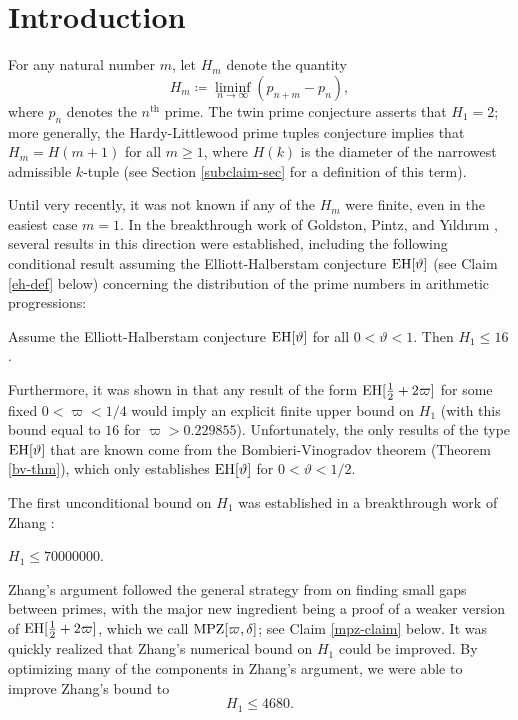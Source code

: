
\section{Introduction}

For any natural number $m$, let $H_m$ denote the quantity
$$ H_m \coloneqq \liminf_{n \to \infty} (p_{n+m} - p_n),$$
where $p_n$ denotes the $n^{\operatorname{th}}$ prime.  The twin prime conjecture asserts that $H_1=2$; more generally, the Hardy-Littlewood prime tuples conjecture \cite{hardy} implies that $H_m = H(m+1)$ for all $m \geq 1$, where $H(k)$ is the diameter of the narrowest admissible $k$-tuple (see Section \ref{subclaim-sec} for a definition of this term).  

Until very recently, it was not known if any of the $H_m$ were finite, even in the easiest case $m=1$.  In the breakthrough work of Goldston, Pintz, and Y{\i}ld{\i}r{\i}m \cite{gpy}, several results in this direction were established, including the following conditional result assuming the Elliott-Halberstam conjecture $\operatorname*{EH}[\vartheta]$ (see Claim \ref{eh-def} below) concerning the distribution of the prime numbers in arithmetic progressions:

\begin{theorem}\label{gpy-thm}  Assume the Elliott-Halberstam conjecture $\operatorname*{EH}[\vartheta]$ for all $0 < \vartheta < 1$.  Then $H_1 \leq 16$.
\end{theorem}

Furthermore, it was shown in \cite{gpy} that any result of the form $\operatorname*{EH}[\frac{1}{2} + 2\varpi]$ for some fixed $0 < \varpi < 1/4$ would imply an explicit finite upper bound on $H_1$ (with this bound equal to $16$ for $\varpi > 0.229855$).  Unfortunately, the only results of the type $\operatorname*{EH}[\vartheta]$ that are known come from the Bombieri-Vinogradov theorem (Theorem \ref{bv-thm}), which only establishes $\operatorname*{EH}[\vartheta]$ for $0 < \vartheta < 1/2$.

The first unconditional bound on $H_1$ was established  in a breakthrough work of Zhang \cite{zhang}:

\begin{theorem}\label{zhang-thm}  $H_1 \leq \num{70000000}$.
\end{theorem}

Zhang's argument followed the general strategy from \cite{gpy} on finding small gaps between primes, with the major new ingredient being a proof of a weaker version of $\operatorname*{EH}[\frac{1}{2}+2\varpi]$, which we call $\operatorname*{MPZ}[\varpi,\delta]$; see Claim \ref{mpz-claim} below.  It was quickly realized that Zhang's numerical bound on $H_1$ could be improved.  By optimizing many of the components in Zhang's argument, we were able \cite{polymath8a, polymath8a-unabridged} to improve Zhang's bound to
$$ H_1 \leq \num{4680}.$$

